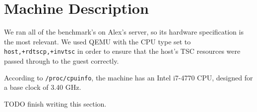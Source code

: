 \section{Machine Description}

We ran all of the benchmark's on Alex's server, so its hardware
specification is the most relevant.  We used QEMU with the CPU type
set to \verb|host,+rdtscp,+invtsc| in order to ensure that the host's
TSC resources were passed through to the guest correctly.

According to \verb|/proc/cpuinfo|, the machine has an Intel i7-4770
CPU, designed for a base clock of 3.40 GHz.

TODO finish writing this section.
